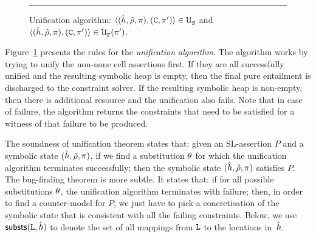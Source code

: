 \begin{figure}[t!]
{\scriptsize
\centering
{}}
\hrule
\caption{Unification algorithm: {\small $\langle (\hat{h}, \hat\rho, \pi), (\mathtt{C}, \pi') \rangle \in {\cal U}_{\mathtt{S}}^{}$}
and {\small $\langle (\hat{h}, \hat\rho, \pi), (\mathtt{C}, \pi') \rangle \in {\cal U}_{\mathtt{F}}^{}(\pi')$}.\label{unification:algorithm}}
\end{figure}

Figure~\ref{unification:algorithm} presents the rules for the \emph{unification algorithm}. 
The algorithm works by trying to unify the non-none cell assertions first. If they are all 
successfully unified and the resulting symbolic heap is empty, then the final pure entailment 
is discharged to the constraint solver. If the resulting symbolic heap is non-empty, then there 
is additional resource and the unification also fails. Note that in case of failure, the algorithm 
returns the constraints that need to be satisfied for a witness of that failure to be produced. 

The soundness of unification theorem states that: given an SL-assertion $P$ and a 
symbolic state $(\hat{h}, \hat\rho, \pi)$, if we find a substitution $\theta$ 
for which the unification algorithm terminates successfully; then the symbolic state
$(\hat{h}, \hat\rho, \pi)$ satisfies $P$. 
The bug-finding theorem is more subtle. It states that: if for all possible substitutions 
$\theta$, the unification algorithm terminates with failure; then, in order to find a counter-model 
for $P$, we just have to pick a concretisation of the symbolic state that is consistent with all 
the failing constraints. Below, we use ${\sf substs}(\mathtt{L}, \hat{h})$ to denote 
the set of all mappings from $\mathtt{L}$ to the locations in~$\hat{h}$. 

